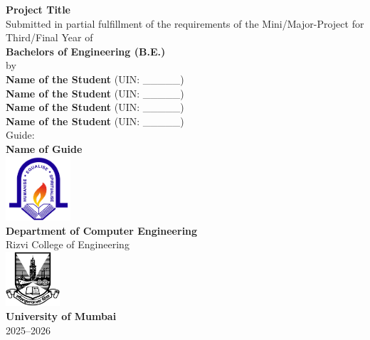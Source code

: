 \documentclass[12pt,a4paper,twoside,openright]{report}
\begin{document}
	
	\begin{titlepage}
		\centering
		\vspace*{0.2cm}
		\Huge \textbf{Project Title} \\[1cm]
		\large  {Submitted in partial fulfillment of the requirements of the Mini/Major-Project for Third/Final Year of} \\[0.5cm]
		\Large \textbf{Bachelors of Engineering (B.E.)} \\[0.5cm]
		\large by \\[0.5cm]
		\large \textbf{Name of the Student } (UIN: \_\_\_\_\_) \\
		\large \textbf{Name of the Student } (UIN: \_\_\_\_\_) \\
		\large \textbf{Name of the Student } (UIN: \_\_\_\_\_) \\
		\large \textbf{Name of the Student } (UIN: \_\_\_\_\_) \\ [1cm]
		 
		
		\large {Guide:} \\ 
		\large \textbf{Name of Guide} \\[1cm]
		
		\includegraphics[width=0.18\textwidth]{images/rcoe-logo.png}\\
		\Large \textbf{ Department of Computer Engineering} \\
		{\LARGE Rizvi College of Engineering} \\[1cm]
		
		\includegraphics[width=0.15\textwidth]{images/mu-logo.png}\\
		\LARGE \textbf{University of Mumbai} \\
		2025--2026 \\
	\end{titlepage}
	
	
	
\end{document}
